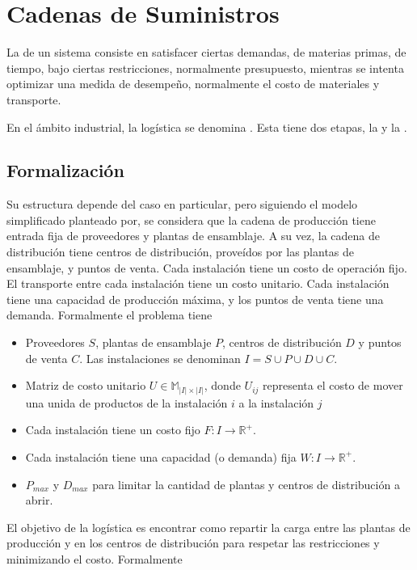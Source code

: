\chapter{Cadenas de Suministros}\label{cap:supply}

La  de un sistema consiste en satisfacer ciertas
demandas, de materias primas, de tiempo, bajo ciertas restricciones,
normalmente presupuesto, mientras se intenta optimizar una medida de
desempeño, normalmente el costo de materiales y transporte.

En el ámbito industrial, la logística se denomina .  Esta tiene dos etapas, la 
y la \cite{Musmanno2004}.

\section{Formalización}

Su estructura depende del caso en particular, pero siguiendo el modelo
simplificado planteado por\cite{Canales2016}, se considera que la
cadena de producción tiene entrada fija de proveedores y plantas de
ensamblaje. A su vez, la cadena de distribución tiene centros de
distribución, proveídos por las plantas de ensamblaje, y puntos de
venta. Cada instalación tiene un costo de operación fijo. El
transporte entre cada instalación tiene un costo unitario.  Cada
instalación tiene una capacidad de producción máxima, y los puntos de
venta tiene una demanda. Formalmente el problema tiene

\begin{itemize}
\item Proveedores $S$, plantas de ensamblaje $P$, centros de
  distribución $D$ y puntos de venta $C$. Las instalaciones se
  denominan $I = S \cup P \cup D \cup C$.
\item Matriz de costo unitario $U \in \mathbb{M}_{|I| \times |I|}$,
  donde $U_{ij}$ representa el costo de mover una unida de productos
  de la instalación $i$ a la instalación $j$
\item Cada instalación tiene un costo fijo $F: I \to \mathbb{R}^{+}$.
\item Cada instalación tiene una capacidad (o demanda) fija
  $W: I \to \mathbb{R}^{+}$.
\item $P_{max}$ y $D_{max}$ para limitar la cantidad de plantas y
  centros de distribución a abrir.
\end{itemize}

El objetivo de la logística es encontrar como repartir la carga entre
las plantas de producción y en los centros de distribución para
respetar las restricciones y minimizando el costo. Formalmente

